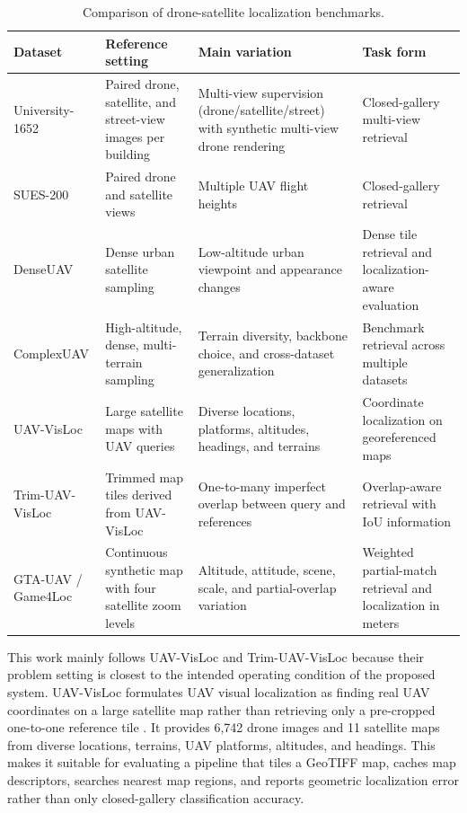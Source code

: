 \documentclass[conference]{IEEEtran}
\begin{document}
\begin{table}[t]
\caption{Comparison of drone-satellite localization benchmarks.}
\label{tab:drone_satellite_benchmarks}
\centering
\scriptsize
\setlength{\tabcolsep}{4pt}
\begin{tabular}{@{}>{\raggedright\arraybackslash}p{}
                >{\raggedright\arraybackslash}p{}
                >{\raggedright\arraybackslash}p{}
                >{\raggedright\arraybackslash}p{}@{}}
\toprule
Dataset & Reference setting & Main variation & Task form \\
\midrule
University-1652 \cite{zheng2020university1652} &
Paired drone, satellite, and street-view images per building &
Multi-view supervision (drone/satellite/street) with synthetic multi-view drone rendering &
Closed-gallery multi-view retrieval \\
SUES-200 \cite{zhu2023sues} &
Paired drone and satellite views &
Multiple UAV flight heights &
Closed-gallery retrieval \\
DenseUAV \cite{dai2024denseuav} &
Dense urban satellite sampling &
Low-altitude urban viewpoint and appearance changes &
Dense tile retrieval and localization-aware evaluation \\
ComplexUAV \cite{chen2025complexuav} &
High-altitude, dense, multi-terrain sampling &
Terrain diversity, backbone choice, and cross-dataset generalization &
Benchmark retrieval across multiple datasets \\
UAV-VisLoc \cite{xu2024uavvisloc} &
Large satellite maps with UAV queries &
Diverse locations, platforms, altitudes, headings, and terrains &
Coordinate localization on georeferenced maps \\
Trim-UAV-\newline VisLoc \cite{li2025onetomany} &
Trimmed map tiles derived from UAV-VisLoc &
One-to-many imperfect overlap between query and references &
Overlap-aware retrieval with IoU information \\
GTA-UAV / \newline Game4Loc \cite{ji2024game4loc} &
Continuous synthetic map with four satellite zoom levels &
Altitude, attitude, scene, scale, and partial-overlap variation &
Weighted partial-match retrieval and localization in meters \\
\bottomrule
\end{tabular}
\end{table}

This work mainly follows UAV-VisLoc and Trim-UAV-VisLoc because their problem
setting is closest to the intended operating condition of the proposed system.
UAV-VisLoc formulates UAV visual localization as finding real UAV coordinates
on a large satellite map rather than retrieving only a pre-cropped one-to-one
reference tile \cite{xu2024uavvisloc}. It provides 6,742 drone images and 11
satellite maps from diverse locations, terrains, UAV platforms, altitudes, and
headings. This makes it suitable for evaluating a pipeline that tiles a
GeoTIFF map, caches map descriptors, searches nearest map regions, and reports
geometric localization error rather than only closed-gallery classification
accuracy.
\end{document}
